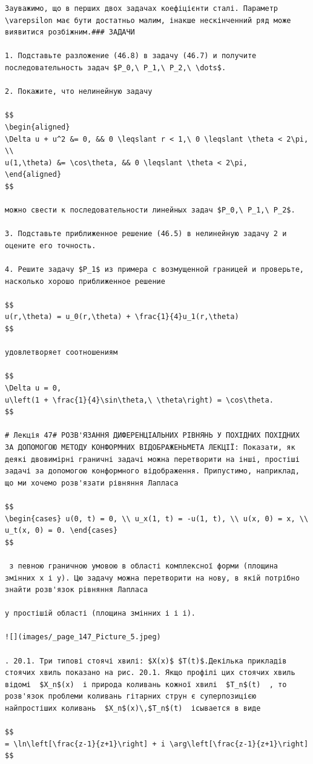 \documentclass[
  ukrainian,
]{article}
\begin{document}
\begin{verbatim}
Зауважимо, що в перших двох задачах коефіцієнти сталі. Параметр \varepsilon має бути достатньо малим, інакше нескінченний ряд може виявитися розбіжним.### ЗАДАЧИ

1. Подставьте разложение (46.8) в задачу (46.7) и получите последовательность задач $P_0,\ P_1,\ P_2,\ \dots$.

2. Покажите, что нелинейную задачу

$$
\begin{aligned}
\Delta u + u^2 &= 0, && 0 \leqslant r < 1,\ 0 \leqslant \theta < 2\pi, \\
u(1,\theta) &= \cos\theta, && 0 \leqslant \theta < 2\pi,
\end{aligned}
$$

можно свести к последовательности линейных задач $P_0,\ P_1,\ P_2$.

3. Подставьте приближенное решение (46.5) в нелинейную задачу 2 и оцените его точность.

4. Решите задачу $P_1$ из примера с возмущенной границей и проверьте, насколько хорошо приближенное решение

$$
u(r,\theta) = u_0(r,\theta) + \frac{1}{4}u_1(r,\theta)
$$

удовлетворяет соотношениям

$$
\Delta u = 0,
u\left(1 + \frac{1}{4}\sin\theta,\ \theta\right) = \cos\theta.
$$

# Лекція 47# РОЗВ'ЯЗАННЯ ДИФЕРЕНЦІАЛЬНИХ РІВНЯНЬ У ПОХІДНИХ ПОХІДНИХ ЗА ДОПОМОГОЮ МЕТОДУ КОНФОРМНИХ ВІДОБРАЖЕНЬМЕТА ЛЕКЦІЇ: Показати, як деякі двовимірні граничні задачі можна перетворити на інші, простіші задачі за допомогою конформного відображення. Припустимо, наприклад, що ми хочемо розв'язати рівняння Лапласа 

$$
\begin{cases} u(0, t) = 0, \\ u_x(1, t) = -u(1, t), \\ u(x, 0) = x, \\ u_t(x, 0) = 0. \end{cases}
$$

 з певною граничною умовою в області комплексної форми (площина змінних x і y). Цю задачу можна перетворити на нову, в якій потрібно знайти розв'язок рівняння Лапласа 

у простішій області (площина змінних і і і).

![](images/_page_147_Picture_5.jpeg)

. 20.1. Три типові стоячі хвилі: $X(x)$ $T(t)$.Декілька прикладів стоячих хвиль показано на рис. 20.1. Якщо профілі цих стоячих хвиль відомі  $X_n$(x)  і природа коливань кожної хвилі  $T_n$(t)  , то розв'язок проблеми коливань гітарних струн є суперпозицією найпростіших коливань  $X_n$(x)\,$T_n$(t)  ісывается в виде

$$
= \ln\left[\frac{z-1}{z+1}\right] + i \arg\left[\frac{z-1}{z+1}\right]
$$
\end{verbatim}
\end{document}
